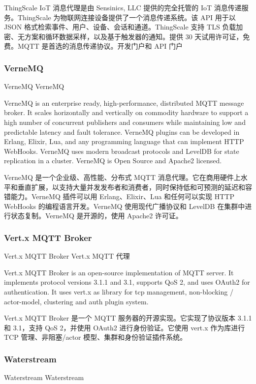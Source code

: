 \documentclass{ctexbook}
\begin{document}
ThingScale IoT 消息代理是由 Sensinics, LLC 提供的完全托管的 IoT 消息传递服务。ThingScale 为物联网连接设备提供了一个消息传递系统。该 API 用于以 JSON 格式检索事件、用户、设备、会话和通道。ThingScale 支持 TLS 负载加密、无方案和循环数据采样，以及基于触发器的通知。提供 30 天试用许可证，免费。MQTT 是首选的消息传递协议。开发门户和 API 门户

\subsubsection{VerneMQ}
VerneMQ VerneMQ

VerneMQ is an enterprise ready, high-performance, distributed MQTT message broker. It scales horizontally and vertically on commodity hardware to support a high number of concurrent publishers and consumers while maintaining low and predictable latency and fault tolerance. VerneMQ plugins can be developed in Erlang, Elixir, Lua, and any programming language that can implement HTTP WebHooks. VerneMQ uses modern broadcast protocols and LevelDB for state replication in a cluster. VerneMQ is Open Source and Apache2 licensed.

VerneMQ 是一个企业级、高性能、分布式 MQTT 消息代理。它在商用硬件上水平和垂直扩展，以支持大量并发发布者和消费者，同时保持低和可预测的延迟和容错能力。VerneMQ 插件可以用 Erlang、Elixir、Lua 和任何可以实现 HTTP WebHooks 的编程语言开发。VerneMQ 使用现代广播协议和 LevelDB 在集群中进行状态复制。VerneMQ 是开源的，使用 Apache2 许可证。

\subsubsection{Vert.x MQTT Broker}
Vert.x MQTT Broker Vert.x MQTT 代理

Vert.x MQTT Broker is an open-source implementation of MQTT server. It implements protocol versions 3.1.1 and 3.1, supports QoS 2, and uses OAuth2 for authentication. It uses vert.x as library for tcp management, non-blocking / actor-model, clustering and auth plugin system.

Vert.x MQTT Broker 是一个 MQTT 服务器的开源实现。它实现了协议版本 3.1.1 和 3.1，支持 QoS 2，并使用 OAuth2 进行身份验证。它使用 vert.x 作为库进行 TCP 管理、非阻塞/actor 模型、集群和身份验证插件系统。

\subsubsection{Waterstream}
Waterstream Waterstream
\end{document}
